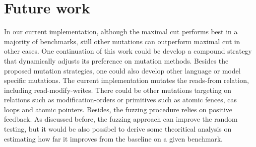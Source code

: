 \section{Future work}

In our current implementation, although the maximal cut performs best in a majority of benchmarks, still other mutations can outperform maximal cut in other cases. One continuation of this work could be develop a compound strategy that dynamically adjusts its preference on mutation methods. Besides the proposed mutation strategies, one could also develop other language or model specific mutations. The current implementation mutates the reads-from relation, including read-modify-writes. There could be other mutations targeting on relations such as modification-orders or primitives such as atomic fences, cas loops and atomic pointers. Besides, the fuzzing procedure relies on positive feedback. As discussed before, the fuzzing approach can improve the random testing, but it would be also possibel to derive some theoritical analysis on estimating how far it improves from the baseline on a given benchmark. 
